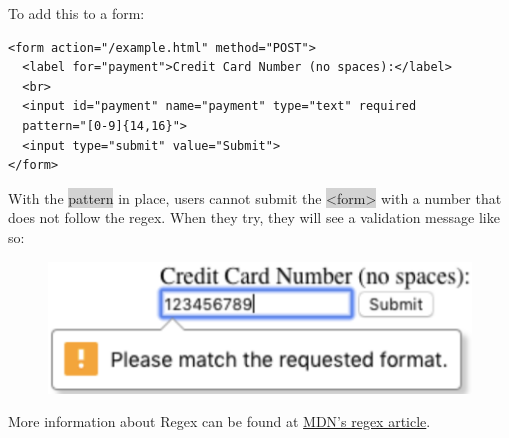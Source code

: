 \documentclass[11pt]{article}
\begin{document}
To add this to a form:
\begin{lstlisting}
<form action="/example.html" method="POST">
  <label for="payment">Credit Card Number (no spaces):</label>
  <br>
  <input id="payment" name="payment" type="text" required 
  pattern="[0-9]{14,16}">
  <input type="submit" value="Submit">
</form>
\end{lstlisting}
With the \colorbox{lightgray}{pattern} in place, users cannot submit the \colorbox{lightgray}{<form>} with a number that does not follow the regex. When they try, they will see a validation message like so:
\begin{figure}[H]
\includegraphics[scale = 0.45]{5_4}
\centering
\end{figure}
\vspace{-4mm}
More information about Regex can be found at \href{https://developer.mozilla.org/en-US/docs/Web/JavaScript/Guide/Regular_Expressions}{MDN’s regex article}.
\end{document}
